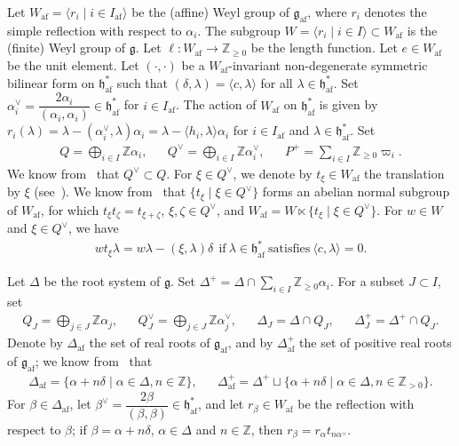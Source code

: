 \documentclass[ALCO,ThmDefs,Unicode,epreuves]{cedram}
\newcommand{\Fg}{\mathfrak{g}}
\newcommand{\Fh}{\mathfrak{h}}
\newcommand{\BZ}{\mathbb{Z}}
\DeclareMathOperator{\af}{af}
\begin{document}
Let 
$W_{\af} = \langle r_i \mid i \in I_{\af} \rangle$ 
be the (affine) Weyl group of $\Fg_{\af}$, 
where $r_i$ denotes the simple reflection with respect to $\alpha_i$.
The subgroup 
$W = \langle r_i \mid i \in I \rangle \subset W_{\af}$ 
is the (finite) Weyl group of $\Fg$. 
Let $\ell : W_{\af} \rightarrow \BZ_{\geq 0}$ be the length function. 
Let $e \in W_{\af}$ be the unit element. 
Let 
$(\cdot , \cdot)$
be a $W_{\af}$-invariant non-degenerate symmetric bilinear form on $\Fh_{\af}^*$ such that
$(\delta,\lambda) = \langle c,\lambda \rangle$ 
for all $\lambda \in \Fh_{\af}^*$. 
Set $\alpha_i^{\vee} = \dfrac{2 \alpha_i}{(\alpha_i , \alpha_i)} \in \Fh_{\af}^*$ for $i \in I_{\af}$.
The action of $W_{\af}$ on $\Fh_{\af}^*$ is given by
$r_i (\lambda) 
= 
\lambda - (\alpha_i^{\vee} , \lambda) \alpha_i
=
\lambda - \langle h_i , \lambda \rangle \alpha_i$ 
for $i \in I_{\af}$ and $\lambda \in \Fh_{\af}^*$.
Set
\begin{align}
Q
= 
\bigoplus_{i \in I} \BZ \alpha_i, &&
Q^{\vee} 
= 
\bigoplus_{i \in I} \BZ \alpha_i^{\vee}, &&
P^+ 
= 
\sum_{i \in I} \BZ_{\geq 0} \varpi_i.
\end{align}
We know from~\cite[\S~6.5]{Kac} that 
$Q^{\vee} \subset Q$. 
For $\xi \in Q^{\vee}$, 
we denote by 
$t_{\xi} \in W_{\af}$ 
the translation by $\xi$ (see~\cite[\S6.5]{Kac}).
We know from~\cite[Proposition~6.5]{Kac} 
that 
$\{ t_{\xi} \mid \xi \in Q^{\vee} \}$ 
forms an abelian normal subgroup of $W_{\af}$, 
for which 
$t_{\xi} t_{\zeta} = t_{\xi + \zeta}$, 
$\xi , \zeta \in Q^{\vee}$, 
and 
$W_{\af} = W \ltimes \{ t_{\xi} \mid \xi \in Q^{\vee} \}$. 
For $w \in W$ and $\xi \in Q^{\vee}$, we have 
\begin{align} \label{eq:lv0-act}
wt_{\xi}\lambda = w\lambda - ( \xi,\lambda ) \delta \ \ 
\text{if} \ 
\lambda \in \Fh_{\af}^* \ 
\text{satisfies} \ 
\langle c,\lambda \rangle = 0.
\end{align}

Let $\Delta$ be the root system of $\Fg$. 
Set $\Delta^+ = \Delta \cap \sum_{i \in I} \BZ_{\geq 0} \alpha_i$. 
For a subset $J \subset I$, set
\begin{align}
Q_J = \bigoplus_{j \in J} \BZ \alpha_j, && 
Q_J^{\vee} = \bigoplus_{j \in J} \BZ \alpha_j^{\vee}, && 
\Delta_J = \Delta \cap Q_J, && 
\Delta_J^+ = \Delta^+ \cap Q_J. 
\end{align}
Denote by $\Delta_{\af}$ the set of real roots of $\Fg_{\af}$, 
and by $\Delta_{\af}^+$ the set of positive real roots of $\Fg_{\af}$; 
we know from~\cite[Proposition~6.3]{Kac} that
\begin{align}
\Delta_{\af} 
= 
\{ \alpha + n\delta \mid \alpha \in \Delta , n \in \BZ \} , &&
\Delta_{\af}^+
= 
\Delta^+ 
\sqcup
\{ \alpha + n\delta \mid \alpha \in \Delta , n \in \BZ_{>0} \} .
\end{align}
For $\beta \in \Delta_{\af}$, 
let 
$\beta^{\vee} = \dfrac{2\beta}{(\beta,\beta)} \in \Fh_{\af}^*$, 
and let 
$r_{\beta} \in W_{\af}$ 
be the reflection with respect to $\beta$; 
if $\beta = \alpha + n\delta$, $\alpha \in \Delta$ and $n \in \BZ$, then
$r_{\beta} = r_{\alpha} t_{n\alpha^{\vee}}$.
\end{document}
